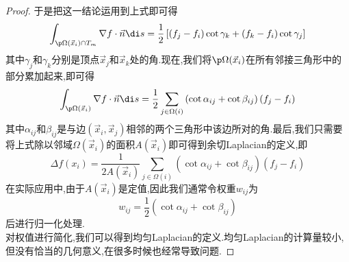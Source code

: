 \documentclass{ctexart}
\begin{document}
\begin{proof}
    于是把这一结论运用到上式即可得
    \[\int_{\p\Omega(\vec{x}_i)\cap T_m}\nabla f\cdot\vec{n}\di s=\dfrac12\left[\left(f_j-f_i\right)\cot\gamma_k+\left(f_k-f_i\right)\cot\gamma_j\right]\]
    其中$\gamma_j$和$\gamma_k$分别是顶点$\vec{x}_j$和$\vec{x}_k$处的角.现在,我们将$\p\Omega(\vec{x}_i)$在所有邻接三角形中的部分累加起来,即可得
    \[\int_{\p\Omega(\vec{x}_i)}\nabla f\cdot\vec{n}\di s=\dfrac{1}{2}\sum_{j\in\Omega(i)}\left(\cot\alpha_{ij}+\cot\beta_{ij}\right)\left(f_j-f_i\right)\]
    其中$\alpha_{ij}$和$\beta_{ij}$是与边$(\vec{x}_i,\vec{x}_j)$相邻的两个三角形中该边所对的角.最后,我们只需要将上式除以邻域$\Omega(\vec{x}_i)$的面积$A(\vec{x}_i)$即可得到余切Laplacian的定义,即
    \[\Delta f\left(x_i\right)=\dfrac{1}{2A(\vec{x}_i)}\sum_{j\in\Omega(i)}\left(\cot\alpha_{ij}+\cot\beta_{ij}\right)\left(f_j-f_i\right)\]
    在实际应用中,由于$A(\vec{x}_i)$是定值,因此我们通常令权重$w_{ij}$为
    \[w_{ij}=\dfrac12\left(\cot\alpha_{ij}+\cot\beta_{ij}\right)\]
    后进行归一化处理.\\
    \indent 对权值进行简化,我们可以得到均匀Laplacian的定义.均匀Laplacian的计算量较小,但没有恰当的几何意义,在很多时候也经常导致问题.
\end{proof}
\end{document}
